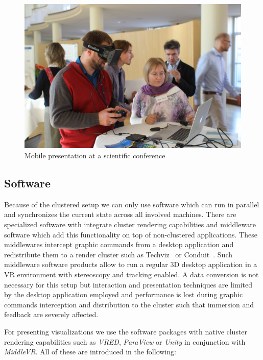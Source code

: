 \documentclass[twocolumn]{svjour3}          %
\begin{document}
\begin{figure}
  \includegraphics[width=\linewidth]{images/rift.jpg}
\caption{Mobile presentation at a scientific conference}
\label{fig:rift}
\end{figure}

\subsection{Software}
\label{software}

Because of the clustered setup we can only use software which can run in parallel and synchronizes the current state across all involved machines. There are specialized software with integrate cluster rendering capabilities and middleware software which add this functionality on top of non-clustered applications. These middlewares intercept graphic commands from a desktop application and redistribute them to a render cluster such as Techviz~\cite{web:techviz} or Conduit~\cite{web:conduit}. Such middleware software products allow to run a regular 3D desktop application in a VR environment with stereoscopy and tracking enabled. A data conversion is not necessary for this setup but interaction and presentation techniques are limited by the desktop application employed and performance is lost during graphic commands interception and distribution to the cluster such that immersion and feedback are severely affected.

For presenting visualizations we use the software packages with native cluster rendering capabilities such as \emph{VRED}, \emph{ParaView} or \emph{Unity} in conjunction with \emph{MiddleVR}. All of these are introduced in the following:
\end{document}
